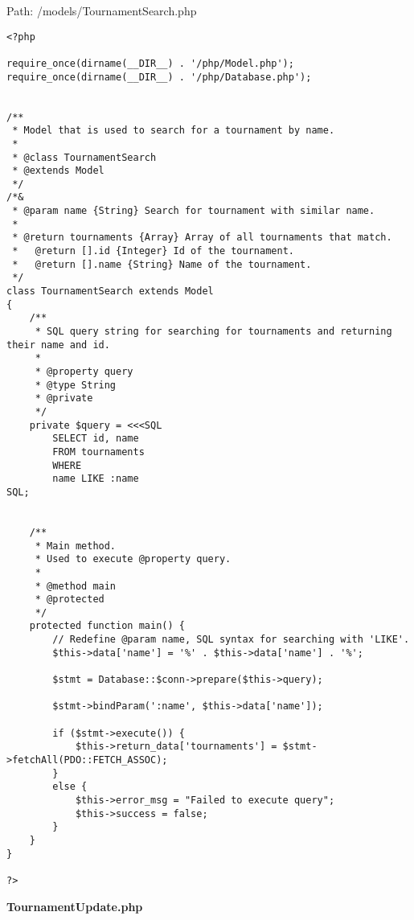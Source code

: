 Path: /models/TournamentSearch.php
{\scriptsize
\begin{lstlisting}
<?php

require_once(dirname(__DIR__) . '/php/Model.php');
require_once(dirname(__DIR__) . '/php/Database.php');


/**
 * Model that is used to search for a tournament by name.
 *
 * @class TournamentSearch
 * @extends Model
 */
/*&
 * @param name {String} Search for tournament with similar name.
 *
 * @return tournaments {Array} Array of all tournaments that match.
 *   @return [].id {Integer} Id of the tournament.
 *   @return [].name {String} Name of the tournament.
 */
class TournamentSearch extends Model
{
	/**
	 * SQL query string for searching for tournaments and returning their name and id.
	 *
	 * @property query
	 * @type String
	 * @private
	 */
	private $query = <<<SQL
		SELECT id, name
		FROM tournaments
		WHERE
		name LIKE :name
SQL;


	/**
	 * Main method.
	 * Used to execute @property query.
	 *
	 * @method main
	 * @protected
	 */
	protected function main() {
		// Redefine @param name, SQL syntax for searching with 'LIKE'.
		$this->data['name'] = '%' . $this->data['name'] . '%';

		$stmt = Database::$conn->prepare($this->query);

		$stmt->bindParam(':name', $this->data['name']);

		if ($stmt->execute()) {
			$this->return_data['tournaments'] = $stmt->fetchAll(PDO::FETCH_ASSOC);
		}
		else {
			$this->error_msg = "Failed to execute query";
			$this->success = false;
		}
	}
}

?>\end{lstlisting}
}
\textbf{TournamentUpdate.php}

